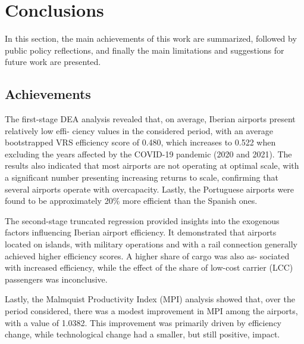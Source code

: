 
\section{Conclusions}
\label{sec:concl}
In this section, the main achievements of this work are summarized, followed by public policy reflections, and finally the main limitations and suggestions for future work are presented.
\subsection{Achievements}

The first-stage DEA analysis revealed that, on average, Iberian airports present relatively low effi-
ciency values in the considered period, with an average bootstrapped VRS efficiency score of 0.480, which increases to 0.522 when excluding the years affected by the COVID-19 pandemic (2020 and
2021). The results also indicated that most airports are not operating at optimal scale, with a significant
number presenting increasing returns to scale, confirming that several airports operate with overcapacity. Lastly, the Portuguese airports were found to be approximately
20\% more efficient than the Spanish ones.

The second-stage truncated regression provided insights into the exogenous factors influencing
Iberian airport efficiency. It demonstrated that airports located on islands, with military operations and
with a rail connection generally achieved higher efficiency scores. A higher share of cargo was also as-
sociated with increased efficiency, while the effect of the share of low-cost carrier (LCC) passengers was
inconclusive.

Lastly, the Malmquist Productivity Index (MPI) analysis showed that, over the period considered,
there was a modest improvement in MPI among the airports, with a value of 1.0382. This improvement
was primarily driven by efficiency change, while technological change had a smaller, but still positive,
impact.


